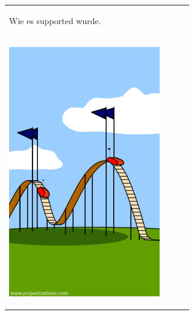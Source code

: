 \begin{tabularx}{\textwidth}{XXXX}
\begin{minipage}[t]{0.23\textwidth}
\begin{center}
Wie es supported wurde.
\end{center}
\end{minipage}
\\
\begin{minipage}[t]{0.23\textwidth}
\begin{center}
\includegraphics[width=1.0\textwidth]{./inf/SEKII/29_Softwaretechnik/PM_09.jpg}


\end{center}
\end{minipage}
\end{tabularx}
